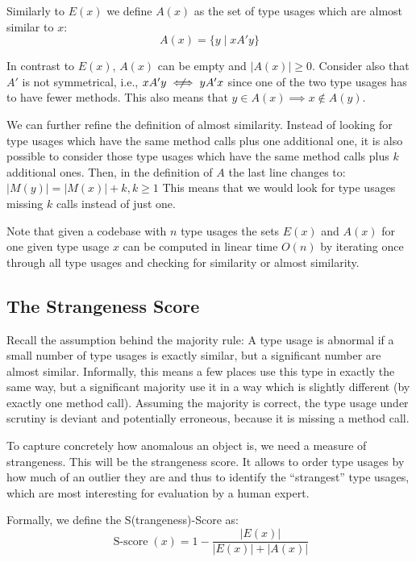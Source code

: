 Similarly to $E(x)$ we define $A(x)$ as the set of type usages which are almost similar to $x$:
\begin{equation*}
A(x) = \{y \mid xA'y \}
\end{equation*}

In contrast to $E(x)$, $A(x)$ can be empty and $|A(x)|\geq0$.
Consider also that $A'$ is not symmetrical, i.e., $xA'y \centernot\iff yA'x$ since one of the two type usages has to have fewer methods.
This also means that $y \in A(x) \implies x \notin A(y)$.

We can further refine the definition of almost similarity.
Instead of looking for type usages which have the same method calls plus one additional one, it is also possible to consider those type usages which have the same method calls plus $k$ additional ones.
Then, in the definition of $A$ the last line changes to: $|M(y)| = |M(x)| + k, k\geq1$
This means that we would look for type usages missing $k$ calls instead of just one.

Note that given a codebase with $n$ type usages the sets $E(x)$ and $A(x)$ for one given type usage $x$ can be computed in linear time $O(n)$ by iterating once through all type usages and checking for similarity or almost similarity.

\subsection{The Strangeness Score}

Recall the assumption behind the majority rule: A type usage is abnormal if a small number of type usages is exactly similar, but a significant number are almost similar.
Informally, this means a few places use this type in exactly the same way, but a significant majority use it in a way which is slightly different (by exactly one method call).
Assuming the majority is correct, the type usage under scrutiny is deviant and potentially erroneous, because it is missing a method call.

To capture concretely how anomalous an object is, we need a measure of strangeness.
This will be the strangeness score.
It allows to order type usages by how much of an outlier they are and thus to identify the ``strangest'' type usages, which are most interesting for evaluation by a human expert.

Formally, we define the S(trangeness)-Score as:
\begin{equation*}
    \operatorname{S-score}(x) = 1 - \frac{|E(x)|}{|E(x)|+|A(x)|}
\end{equation*}


